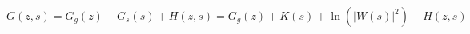 \begin{equation}\label{K}
    G(z,s) = G_{g}(z)+ G_{s}(s) + H(z,s) = G_{g}(z)+ K(s) +
    \ln(|W(s)|^{2}) + H(z,s)
\end{equation}

